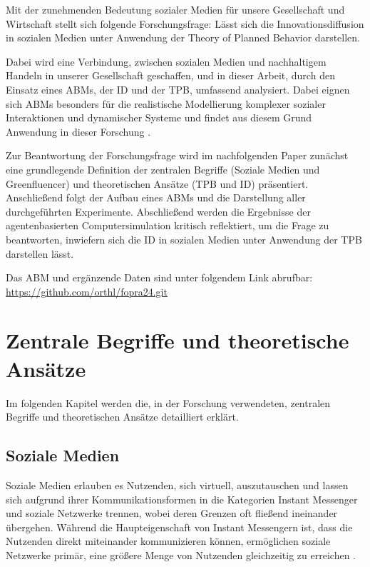 \documentclass[runningheads]{llncs}
\begin{document}
Mit der zunehmenden Bedeutung sozialer Medien für unsere Gesellschaft und Wirtschaft stellt sich folgende Forschungsfrage: Lässt sich die Innovationsdiffusion in sozialen Medien unter Anwendung der Theory of Planned Behavior darstellen.

Dabei wird eine Verbindung, zwischen sozialen Medien und nachhaltigem Handeln in unserer Gesellschaft geschaffen, und in dieser Arbeit, durch den Einsatz eines ABMs, der ID und der TPB, umfassend analysiert. 
Dabei eignen sich ABMs besonders für die realistische Modellierung komplexer sozialer Interaktionen und dynamischer Systeme und findet aus diesem Grund Anwendung in dieser Forschung \cite{kiesling_agent-based_2012}. 

Zur Beantwortung der Forschungsfrage wird im nachfolgenden Paper zunächst eine grundlegende Definition der zentralen Begriffe (Soziale Medien und Greenfluencer) und theoretischen Ansätze (TPB und ID) präsentiert.
Anschließend folgt der Aufbau eines ABMs und die Darstellung aller durchgeführten Experimente. 
Abschließend werden die Ergebnisse der agentenbasierten Computersimulation kritisch reflektiert, um die Frage zu beantworten, inwiefern sich die ID in sozialen Medien unter Anwendung der TPB darstellen lässt. 

Das ABM und ergänzende Daten sind unter folgendem Link abrufbar: \\
\href{https://github.com/orthl/fopra24.git}{https://github.com/orthl/fopra24.git}


\section{Zentrale Begriffe und theoretische Ansätze}\label{Zentrale Begriffe und theoretische Ansätze}

Im folgenden Kapitel werden die, in der Forschung verwendeten, zentralen Begriffe und theoretischen Ansätze detailliert erklärt. 

\subsection{Soziale Medien}\label{soziale-medien}
Soziale Medien erlauben es Nutzenden, sich virtuell, auszutauschen und lassen sich aufgrund ihrer Kommunikationsformen in die  Kategorien Instant Messenger und soziale Netzwerke trennen, wobei deren Grenzen oft fließend ineinander übergehen. 
Während die Haupteigenschaft von Instant Messengern ist, dass die Nutzenden direkt miteinander kommunizieren können, ermöglichen soziale Netzwerke primär, eine größere Menge von Nutzenden gleichzeitig zu erreichen \cite{waschbusch_definition_nodate}.
\end{document}
